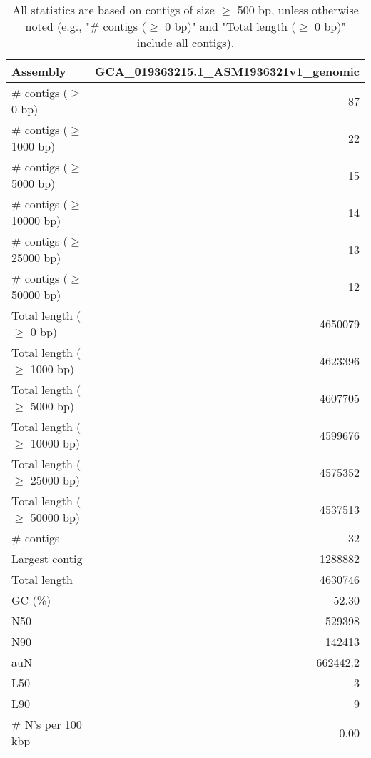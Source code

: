 \documentclass[12pt,a4paper]{article}
\begin{document}
\begin{table}[ht]
\begin{center}
\caption{All statistics are based on contigs of size $\geq$ 500 bp, unless otherwise noted (e.g., "\# contigs ($\geq$ 0 bp)" and "Total length ($\geq$ 0 bp)" include all contigs).}
\begin{tabular}{|l*{1}{|r}|}
\hline
Assembly & GCA\_019363215.1\_ASM1936321v1\_genomic \\ \hline
\# contigs ($\geq$ 0 bp) & 87 \\ \hline
\# contigs ($\geq$ 1000 bp) & 22 \\ \hline
\# contigs ($\geq$ 5000 bp) & 15 \\ \hline
\# contigs ($\geq$ 10000 bp) & 14 \\ \hline
\# contigs ($\geq$ 25000 bp) & 13 \\ \hline
\# contigs ($\geq$ 50000 bp) & 12 \\ \hline
Total length ($\geq$ 0 bp) & 4650079 \\ \hline
Total length ($\geq$ 1000 bp) & 4623396 \\ \hline
Total length ($\geq$ 5000 bp) & 4607705 \\ \hline
Total length ($\geq$ 10000 bp) & 4599676 \\ \hline
Total length ($\geq$ 25000 bp) & 4575352 \\ \hline
Total length ($\geq$ 50000 bp) & 4537513 \\ \hline
\# contigs & 32 \\ \hline
Largest contig & 1288882 \\ \hline
Total length & 4630746 \\ \hline
GC (\%) & 52.30 \\ \hline
N50 & 529398 \\ \hline
N90 & 142413 \\ \hline
auN & 662442.2 \\ \hline
L50 & 3 \\ \hline
L90 & 9 \\ \hline
\# N's per 100 kbp & 0.00 \\ \hline
\end{tabular}
\end{center}
\end{table}
\end{document}
